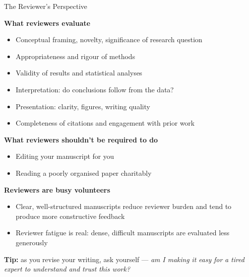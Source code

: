 \documentclass{beamer}
\begin{document}
\begin{frame}{The Reviewer's Perspective}

  \footnotesize
  \textbf{What reviewers evaluate}
  \begin{itemize}
    \item Conceptual framing, novelty, significance of research question
    \item Appropriateness and rigour of methods
    \item Validity of results and statistical analyses
    \item Interpretation: do conclusions follow from the data?
    \item Presentation: clarity, figures, writing quality
    \item Completeness of citations and engagement with prior work
  \end{itemize}

  \medskip
  \textbf{What reviewers shouldn't be required to do}
  \begin{itemize}
    \item Editing your manuscript for you
    \item Reading a poorly organised paper charitably
  \end{itemize}

  \medskip
  \textbf{Reviewers are busy volunteers}
  \begin{itemize}
    \item Clear, well-structured manuscripts reduce reviewer
      burden and tend to produce more constructive feedback
    \item Reviewer fatigue is real: dense, difficult manuscripts
      are evaluated less generously
  \end{itemize}

  \medskip
  \textbf{Tip:} as you revise your writing, ask yourself --- \emph{am I making
  it easy for a tired expert to understand and trust this work?}

\end{frame}


\end{document}
